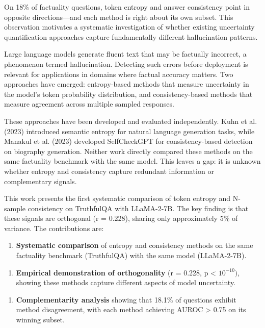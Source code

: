 
On 18\% of factuality questions, token entropy and answer consistency point in opposite directions---and each method is right about its own subset. This observation motivates a systematic investigation of whether existing uncertainty quantification approaches capture fundamentally different hallucination patterns.

Large language models generate fluent text that may be factually incorrect, a phenomenon termed hallucination. Detecting such errors before deployment is relevant for applications in domains where factual accuracy matters. Two approaches have emerged: entropy-based methods that measure uncertainty in the model's token probability distribution, and consistency-based methods that measure agreement across multiple sampled responses.

These approaches have been developed and evaluated independently. Kuhn et al. (2023) introduced semantic entropy for natural language generation tasks, while Manakul et al. (2023) developed SelfCheckGPT for consistency-based detection on biography generation. Neither work directly compared these methods on the same factuality benchmark with the same model. This leaves a gap: it is unknown whether entropy and consistency capture redundant information or complementary signals.

This work presents the first systematic comparison of token entropy and N-sample consistency on TruthfulQA with LLaMA-2-7B. The key finding is that these signals are orthogonal (r = 0.228), sharing only approximately 5\% of variance. The contributions are:

\begin{enumerate}
\item \textbf{Systematic comparison} of entropy and consistency methods on the same factuality benchmark (TruthfulQA) with the same model (LLaMA-2-7B).
\end{enumerate}

\begin{enumerate}
\item \textbf{Empirical demonstration of orthogonality} (r = 0.228, p < $10^{-10})$, showing these methods capture different aspects of model uncertainty.
\end{enumerate}

\begin{enumerate}
\item \textbf{Complementarity analysis} showing that 18.1\% of questions exhibit method disagreement, with each method achieving AUROC > 0.75 on its winning subset.
\end{enumerate}

